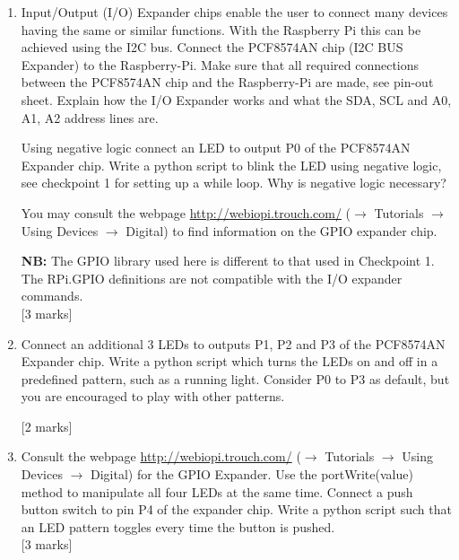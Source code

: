 \begin{enumerate}


\item [4.1.] Input/Output (I/O) Expander chips enable the user to connect many devices having the same or similar functions.  With the Raspberry Pi this can be achieved using the I2C bus. Connect the PCF8574AN chip  (I2C BUS Expander) to the Raspberry-Pi. Make sure that all required connections between the PCF8574AN chip and the Raspberry-Pi are made, see pin-out sheet. Explain how the I/O Expander works and what the SDA, SCL and A0, A1, A2 address lines are. 

Using negative logic connect an LED to output P0 of the PCF8574AN Expander chip. 
Write a python script to blink the LED using negative logic, see checkpoint 1 for setting up a while loop.  Why is negative logic necessary? 

You may consult the \webiopi webpage  \url{http://webiopi.trouch.com/} ($\rightarrow$ Tutorials $\rightarrow$ Using Devices $\rightarrow$ Digital) to find information on the GPIO expander chip.

{\bf NB:} The GPIO library used here is different to that used in Checkpoint 1. The RPi.GPIO definitions are not compatible with the \webiopi I/O expander commands. \\


\hfill [3 marks]\\

\item [4.2.] Connect an additional 3 LEDs to outputs P1, P2 and P3 of the PCF8574AN Expander chip. Write a python script which turns the LEDs on and off in a predefined pattern, such as a running light. Consider P0 to P3 as default, but you are encouraged to play with other patterns. 

\hfill [2 marks]\\

\newpage
\item [4.3.] Consult the webpage \url{http://webiopi.trouch.com/} ($\rightarrow$ Tutorials $\rightarrow$ Using Devices $\rightarrow$ Digital) for the GPIO Expander. Use the portWrite(value) method to manipulate all four LEDs at the same time.  Connect a push button switch to pin P4 of the expander chip. Write a python script such that an LED pattern toggles every time the button is pushed.\\


\hfill [3 marks]\\


\end{enumerate}



